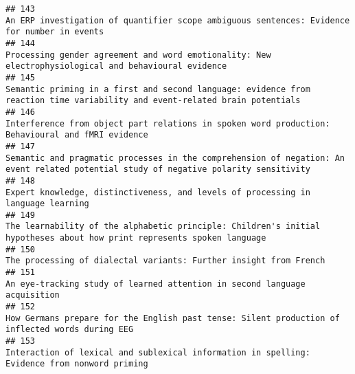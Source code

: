 \documentclass[
  english,
  man]{apa6}
\begin{document}
\begin{verbatim}
## 143                                                                                                                                              An ERP investigation of quantifier scope ambiguous sentences: Evidence for number in events
## 144                                                                                                                                     Processing gender agreement and word emotionality: New electrophysiological and behavioural evidence
## 145                                                                                                              Semantic priming in a first and second language: evidence from reaction time variability and event-related brain potentials
## 146                                                                                                                                         Interference from object part relations in spoken word production: Behavioural and fMRI evidence
## 147                                                                                                     Semantic and pragmatic processes in the comprehension of negation: An event related potential study of negative polarity sensitivity
## 148                                                                                                                                                         Expert knowledge, distinctiveness, and levels of processing in language learning
## 149                                                                                                                   The learnability of the alphabetic principle: Children's initial hypotheses about how print represents spoken language
## 150                                                                                                                                                                        The processing of dialectal variants: Further insight from French
## 151                                                                                                                                                                An eye-tracking study of learned attention in second language acquisition
## 152                                                                                                                                          How Germans prepare for the English past tense: Silent production of inflected words during EEG
## 153                                                                                                                                             Interaction of lexical and sublexical information in spelling: Evidence from nonword priming

\end{verbatim}
\end{document}
